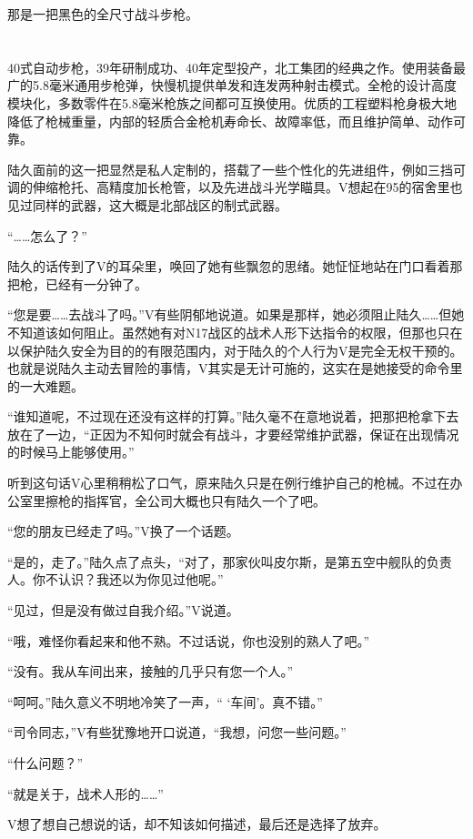 那是一把黑色的全尺寸战斗步枪。



\section*{}

40式自动步枪，39年研制成功、40年定型投产，北工集团的经典之作。使用装备最广的5.8毫米通用步枪弹，快慢机提供单发和连发两种射击模式。全枪的设计高度模块化，多数零件在5.8毫米枪族之间都可互换使用。优质的工程塑料枪身极大地降低了枪械重量，内部的轻质合金枪机寿命长、故障率低，而且维护简单、动作可靠。

陆久面前的这一把显然是私人定制的，搭载了一些个性化的先进组件，例如三挡可调的伸缩枪托、高精度加长枪管，以及先进战斗光学瞄具。V想起在95的宿舍里也见过同样的武器，这大概是北部战区的制式武器。

“……怎么了？”

陆久的话传到了V的耳朵里，唤回了她有些飘忽的思绪。她怔怔地站在门口看着那把枪，已经有一分钟了。

“您是要……去战斗了吗。”V有些阴郁地说道。如果是那样，她必须阻止陆久……但她不知道该如何阻止。虽然她有对N17战区的战术人形下达指令的权限，但那也只在以保护陆久安全为目的的有限范围内，对于陆久的个人行为V是完全无权干预的。也就是说陆久主动去冒险的事情，V其实是无计可施的，这实在是她接受的命令里的一大难题。

“谁知道呢，不过现在还没有这样的打算。”陆久毫不在意地说着，把那把枪拿下去放在了一边，“正因为不知何时就会有战斗，才要经常维护武器，保证在出现情况的时候马上能够使用。”

听到这句话V心里稍稍松了口气，原来陆久只是在例行维护自己的枪械。不过在办公室里擦枪的指挥官，全公司大概也只有陆久一个了吧。

“您的朋友已经走了吗。”V换了一个话题。

“是的，走了。”陆久点了点头，“对了，那家伙叫皮尔斯，是第五空中舰队的负责人。你不认识？我还以为你见过他呢。”

“见过，但是没有做过自我介绍。”V说道。

“哦，难怪你看起来和他不熟。不过话说，你也没别的熟人了吧。”

“没有。我从车间出来，接触的几乎只有您一个人。”

“呵呵。”陆久意义不明地冷笑了一声，“ ‘车间’。真不错。”

“司令同志，”V有些犹豫地开口说道，“我想，问您一些问题。”

“什么问题？”

“就是关于，战术人形的……”

V想了想自己想说的话，却不知该如何描述，最后还是选择了放弃。

